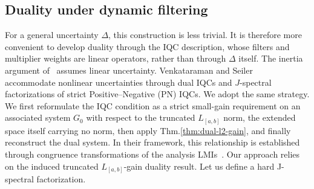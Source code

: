 \subsection{Duality under dynamic filtering}
For a general uncertainty $\Delta$, this construction is
less trivial. It is therefore more convenient to develop duality
through the IQC description, whose filters and multiplier weights are
linear operators, rather than through $\Delta$ itself.
The inertia argument of~\cite{kose2009robust} assumes linear uncertainty.
Venkataraman and Seiler~\cite{venkataraman} accommodate nonlinear
uncertainties through dual IQCs and $J$-spectral factorizations of strict
Positive--Negative (PN) IQCs. We adopt the same strategy.
We first reformulate the IQC condition as a strict small-gain requirement 
on an associated system \(G_0\) with respect to the 
truncated \(L_{[a,b]}\) norm, the extended space itself carrying no norm,
then apply Thm.\ref{thm:dual-l2-gain},
and finally reconstruct the dual system. 
In their framework, this relationship is established through congruence 
transformations of the analysis LMIs~\cite[Sec.~2-3]{venkataraman}. Our approach relies 
on the induced truncated $L_{[a,b]}$-gain duality result. Let us define a hard J-spectral factorization.

